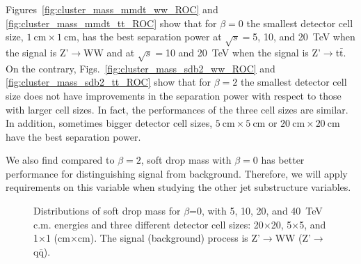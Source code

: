 \documentclass[12pt,twoside,a4paper,an,final]{cms-tdr}
\begin{document}
Figures~\ref{fig:cluster_mass_mmdt_ww_ROC} and 
\ref{fig:cluster_mass_mmdt_tt_ROC} show that for $\beta=0$ the 
smallest detector cell size, 
 $1~\mathrm{cm}\times1~\mathrm{cm}$, has the best separation power at 
$\sqrt{s}=$5, 10, and 20~TeV when the signal is Z'$\rightarrow$WW and 
at  $\sqrt{s}=$10 and 20~TeV when the signal is Z'$\rightarrow$t$\bar{\mathrm{t}}$.
On the contrary, Figs.~\ref{fig:cluster_mass_sdb2_ww_ROC} and \ref{fig:cluster_mass_sdb2_tt_ROC} show that for $\beta=2$ the smallest detector cell size 
does not have improvements in the separation power with respect to those with 
larger cell sizes. In fact, the performances of the three cell sizes are 
similar. In addition, sometimes bigger detector cell sizes, 
$5~\mathrm{cm}\times5~\mathrm{cm}$ or $20~\mathrm{cm}\times20~\mathrm{cm}$
 have the best separation power. 

We also find compared to $\beta=2$, soft drop mass with $\beta=0$ has better 
performance for distinguishing signal from background. Therefore, we will 
apply requirements on this variable when studying the other jet substructure 
variables. 
 
\begin{figure}
\begin{center}
\end{center}
\caption{Distributions of soft drop mass for $\beta$=0, with 5, 10, 20, and 
40~TeV c.m. energies and three different detector cell sizes: 20$\times$20, 
5$\times$5, and 1$\times$1 (cm$\times$cm). The signal (background) process is 
Z'$\rightarrow$WW (Z'$\rightarrow$q$\bar{\mathrm{q}}$).
\label{fig:cluster_mass_mmdt_ww}}
\end{figure}
\end{document}

